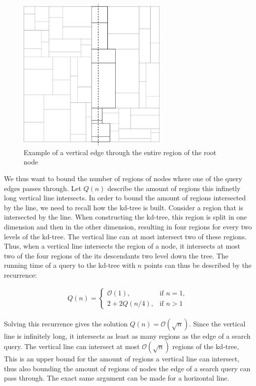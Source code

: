 \begin{figure}[h]
    \centering
    \includegraphics[width = 0.65\textwidth]{pictures/kd_bound2.png}
    \caption{Example of a vertical edge through the entire region of the root node}\label{fig:kd_bound}
\end{figure}

We thus want to bound the number of regions of nodes where one of the query edges passes through. Let $Q(n)$ describe the amount of regions this infinetly long vertical line intersects. In order to bound the amount of regions intersected by the line, we need to recall how the kd-tree is built. Consider a region that is intersected by the line. When constructing the kd-tree, this region is split in one dimension and then in the other dimension, resulting in four regions for every two levels of the kd-tree. The vertical line can at most intersect two of these regions. Thus, when a vertical line intersects the region of a node, it intersects at most two of the four regions of the its descendants two level down the tree. The running time of a query to the kd-tree with $n$ points can thus be described by the recurrence:

\begin{align*}
  Q(n) = \begin{cases}
    \mathcal{O}(1), & \text{if } n = 1,\\
    2 + 2Q(n/4), & \text{if } n > 1
  \end{cases}
\end{align*}

Solving this recurrence gives the solution $Q(n) = \mathcal{O}(\sqrt{n})$. Since the vertical line is infinitely long, it intersects as least as many regions as the edge of a search query. The vertical line can intersect at most $\mathcal{O}(\sqrt{n})$ regions of the kd-tree, This is an upper bound for the amount of regions a vertical line can intersect, thus also bounding the amount of regions of nodes the edge of a search query can pass through. The exact same argument can be made for a horizontal line.


